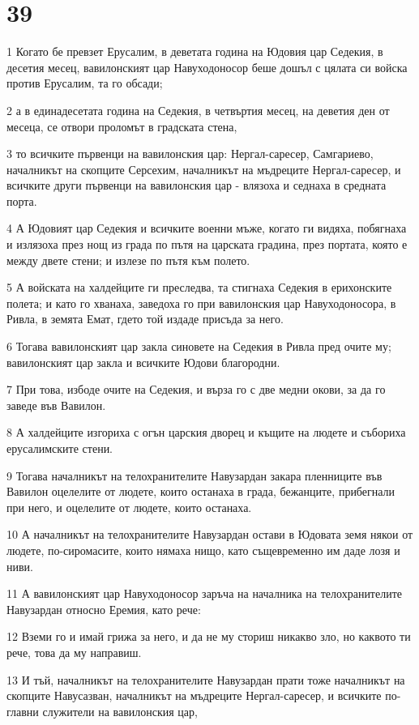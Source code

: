 \chapter{39}

\par 1 Когато бе превзет Ерусалим, в деветата година на Юдовия цар Седекия, в десетия месец, вавилонският цар Навуходоносор беше дошъл с цялата си войска против Ерусалим, та го обсади;
\par 2 а в единадесетата година на Седекия, в четвъртия месец, на деветия ден от месеца, се отвори проломът в градската стена,
\par 3 то всичките първенци на вавилонския цар: Нергал-саресер, Самгариево, началникът на скопците Серсехим, началникът на мъдреците Нергал-саресер, и всичките други първенци на вавилонския цар - влязоха и седнаха в средната порта.
\par 4 А Юдовият цар Седекия и всичките военни мъже, когато ги видяха, побягнаха и излязоха през нощ из града по пътя на царската градина, през портата, която е между двете стени; и излезе по пътя към полето.
\par 5 А войската на халдейците ги преследва, та стигнаха Седекия в ерихонските полета; и като го хванаха, заведоха го при вавилонския цар Навуходоносора, в Ривла, в земята Емат, гдето той издаде присъда за него.
\par 6 Тогава вавилонският цар закла синовете на Седекия в Ривла пред очите му; вавилонският цар закла и всичките Юдови благородни.
\par 7 При това, избоде очите на Седекия, и върза го с две медни окови, за да го заведе във Вавилон.
\par 8 А халдейците изгориха с огън царския дворец и къщите на людете и събориха ерусалимските стени.
\par 9 Тогава началникът на телохранителите Навузардан закара пленниците във Вавилон оцелелите от людете, които останаха в града, бежанците, прибегнали при него, и оцелелите от людете, които останаха.
\par 10 А началникът на телохранителите Навузардан остави в Юдовата земя някои от людете, по-сиромасите, които нямаха нищо, като същевременно им даде лозя и ниви.
\par 11 А вавилонският цар Навуходоносор заръча на началника на телохранителите Навузардан относно Еремия, като рече:
\par 12 Вземи го и имай грижа за него, и да не му сториш никакво зло, но каквото ти рече, това да му направиш.
\par 13 И тъй, началникът на телохранителите Навузардан прати тоже началникът на скопците Навусазван, началникът на мъдреците Нергал-саресер, и всичките по-главни служители на вавилонския цар,
